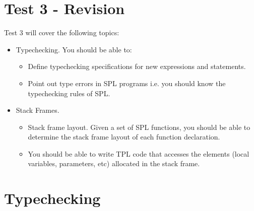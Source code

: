 \documentclass{article}
\begin{document}
\thispagestyle{empty}

\newcommand{\negra}[1]{\textbf{#1}}
\newcommand{\fname}[1]{$\mathit{#1}$}


\section*{Test 3 - Revision}

\medskip\noindent Test 3 will cover the following topics:

\begin{itemize}
\item Typechecking. You should be able to:
\begin{itemize}
\item Define typechecking specifications for new expressions and statements.
\item Point out type errors in SPL programs i.e. you should know the typechecking rules of SPL.
\end{itemize}
\item Stack Frames.
\begin{itemize}
\item Stack frame layout. Given a set of SPL functions, you should be able to determine the stack frame layout of each function declaration.
\item You should be able to write TPL code that accesses the elements (local variables, parameters, etc) allocated in the stack frame.
\end{itemize}
\end{itemize}

\section{Typechecking}
\end{document}

